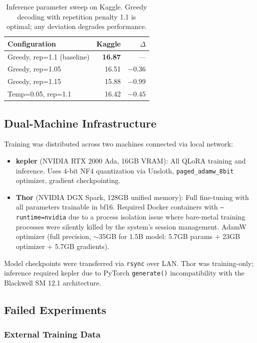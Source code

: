 \documentclass[11pt]{article}
\begin{document}
\begin{table}[h]
\centering
\small
\begin{tabular}{lrr}
\toprule
\textbf{Configuration} & \textbf{Kaggle} & \textbf{$\Delta$} \\
\midrule
Greedy, rep=1.1 (baseline) & \textbf{16.87} & --- \\
Greedy, rep=1.05 & 16.51 & $-0.36$ \\
Greedy, rep=1.15 & 15.88 & $-0.99$ \\
Temp=0.05, rep=1.1 & 16.42 & $-0.45$ \\
\bottomrule
\end{tabular}
\caption{Inference parameter sweep on Kaggle. Greedy decoding with repetition penalty 1.1 is optimal; any deviation degrades performance.}
\label{tab:inference-sweep}
\end{table}

\subsection{Dual-Machine Infrastructure}

Training was distributed across two machines connected via local network:

\begin{itemize}
    \item \textbf{kepler} (NVIDIA RTX 2000 Ada, 16GB VRAM): All QLoRA training and inference. Uses 4-bit NF4 quantization via Unsloth, \texttt{paged\_adamw\_8bit} optimizer, gradient checkpointing.
    \item \textbf{Thor} (NVIDIA DGX Spark, 128GB unified memory): Full fine-tuning with all parameters trainable in bf16. Required Docker containers with \texttt{--runtime=nvidia} due to a process isolation issue where bare-metal training processes were silently killed by the system's session management. AdamW optimizer (full precision, $\sim$35GB for 1.5B model: 5.7GB params + 23GB optimizer + 5.7GB gradients).
\end{itemize}

Model checkpoints were transferred via \texttt{rsync} over LAN. Thor was training-only; inference required kepler due to PyTorch \texttt{generate()} incompatibility with the Blackwell SM 12.1 architecture.

\subsection{Failed Experiments}

\subsubsection{External Training Data}
\label{sec:external-data}
\end{document}
